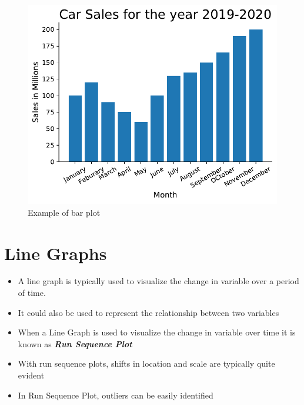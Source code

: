 \documentclass[twoside,12pt]{report}  %
\begin{document}
\begin{figure}[H]
	\centering
	\includegraphics[width=0.5\linewidth]{./images/bargraph_example.pdf}
	\caption{Example of bar plot}
	\label{bargraph_example}
\end{figure}

\vfill
\pagebreak

\section{Line Graphs}

\begin{itemize}
	\item A line graph is typically used to visualize the change in variable over a period of time.
	\item It could also be used to represent the relationship between two variables
	\item When a Line Graph is used to visualize the change in variable over time it is known as \textbf{\textit{Run Sequence Plot}}
	\item With run sequence plots, shifts in location and scale are typically quite evident
	\item In Run Sequence Plot, outliers can be easily identified
\end{itemize}
\end{document}
